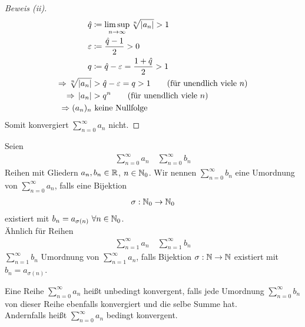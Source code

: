 \begin{satz}[Wurzelkriterium]
\begin{proof}[Beweis (ii)]
        \begin{align*}
            \hat{q}&\coloneqq \limsup_{n\rightarrow{}\infty} \sqrt[n]{\left\lvert a_n\right\rvert} > 1\\
            \varepsilon &\coloneqq \frac{\hat{q}-1}{2}>0\\
            q&\coloneqq \hat{q}-\varepsilon = \frac{1+\hat{q}}{2} > 1\\
            \Rightarrow{} \sqrt[n]{\left\lvert a_n\right\rvert} &> \hat{q}-\varepsilon = q > 1\tag{für unendlich viele $n$}\\
            \Rightarrow{} \left\lvert a_n\right\rvert &> q^n\tag{für unendlich viele $n$}\\
            \Rightarrow{} (a_n)_n&\text{ keine Nullfolge}
        \end{align*}
        Somit konvergiert $\sum_{n=0}^{\infty} a_n$ nicht.
    \end{proof}
\end{satz}

\begin{definition} %
    Seien
    \begin{align*}
        \sum_{n=0}^{\infty} a_n\quad \sum_{n=0}^{\infty} b_n
    \end{align*}
    Reihen mit Gliedern $a_n, b_n\in\mathbb{R}$, $n\in\mathbb{N}_0$. Wir nennen $\sum_{n=0}^{\infty} b_n$ eine Umordnung von $\sum_{n=0}^{\infty} a_n$, falls eine Bijektion
    \begin{align*}
        \sigma: \mathbb{N}_0 \rightarrow{} \mathbb{N}_0
    \end{align*}
    existiert mit $b_n = a_{\sigma(n)}~\forall n\in\mathbb{N}_0$.\\
    Ähnlich für Reihen
    \begin{align*}
        \sum_{n=1}^{\infty} a_n\quad \sum_{n=1}^{\infty} b_n
    \end{align*}
    $\sum_{n=1}^{\infty} b_n$ Umordnung von $\sum_{n=1}^{\infty} a_n$, falls Bijektion $\sigma: \mathbb{N} \rightarrow{}\mathbb{N}$ existiert mit $b_n = a_{\sigma(n)}$.
\end{definition}

\begin{definition} %
    Eine Reihe $\sum_{n=0}^{\infty} a_n$ heißt unbedingt konvergent, falls jede Umordnung $\sum_{n=0}^{\infty} b_n$ von dieser Reihe ebenfalls konvergiert und die selbe Summe hat.\\
    Andernfalls heißt $\sum_{n=0}^{\infty} a_n$ bedingt konvergent.
\end{definition}

